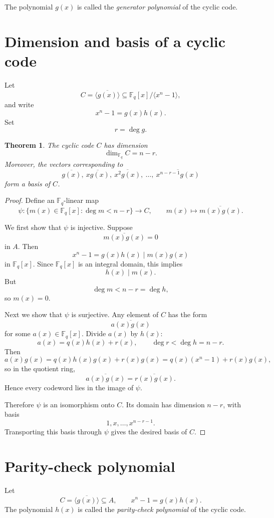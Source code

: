 \documentclass[11pt]{article}
\newtheorem{theorem}{Theorem}[section]
\theoremstyle{definition}
\newcommand{\F}{\mathbb{F}}
\newcommand{\ideal}[1]{\langle #1\rangle}
\newcommand{\ol}[1]{\overline{#1}}
\begin{document}
	The polynomial $g(x)$ is called the \emph{generator polynomial} of the cyclic code.
	
	\section{Dimension and basis of a cyclic code}
	
	Let
	\[
	C=\ideal{\ol{g(x)}}\subseteq \F_q[x]/\ideal{x^n-1},
	\]
	and write
	\[
	x^n-1=g(x)h(x).
	\]
	Set
	\[
	r=\deg g.
	\]
	
	\begin{theorem}\label{thm:dimension-basis}
		The cyclic code $C$ has dimension
		\[
		\dim_{\F_q} C = n-r.
		\]
		Moreover, the vectors corresponding to
		\[
		\ol{g(x)},\ \ol{xg(x)},\ \ol{x^2g(x)},\ \dots,\ \ol{x^{n-r-1}g(x)}
		\]
		form a basis of $C$.
	\end{theorem}
	
	\begin{proof}
		Define an $\F_q$-linear map
		\[
		\psi:\{m(x)\in \F_q[x]: \deg m < n-r\}\longrightarrow C,
		\qquad
		m(x)\longmapsto \ol{m(x)g(x)}.
		\]
		
		We first show that $\psi$ is injective. Suppose
		\[
		\ol{m(x)g(x)}=0
		\]
		in $A$. Then
		\[
		x^n-1=g(x)h(x)\mid m(x)g(x)
		\]
		in $\F_q[x]$. Since $\F_q[x]$ is an integral domain, this implies
		\[
		h(x)\mid m(x).
		\]
		But
		\[
		\deg m < n-r = \deg h,
		\]
		so $m(x)=0$.
		
		Next we show that $\psi$ is surjective. Any element of $C$ has the form
		\[
		\ol{a(x)g(x)}
		\]
		for some $a(x)\in \F_q[x]$. Divide $a(x)$ by $h(x)$:
		\[
		a(x)=q(x)h(x)+r(x),
		\qquad
		\deg r < \deg h = n-r.
		\]
		Then
		\[
		a(x)g(x)=q(x)h(x)g(x)+r(x)g(x)=q(x)(x^n-1)+r(x)g(x),
		\]
		so in the quotient ring,
		\[
		\ol{a(x)g(x)}=\ol{r(x)g(x)}.
		\]
		Hence every codeword lies in the image of $\psi$.
		
		Therefore $\psi$ is an isomorphism onto $C$. Its domain has dimension $n-r$, with basis
		\[
		1,x,\dots,x^{n-r-1}.
		\]
		Transporting this basis through $\psi$ gives the desired basis of $C$.
	\end{proof}
	
	\section{Parity-check polynomial}
	
	Let
	\[
	C=\ideal{\ol{g(x)}}\subseteq A,
	\qquad
	x^n-1=g(x)h(x).
	\]
	The polynomial $h(x)$ is called the \emph{parity-check polynomial} of the cyclic code.
	
\end{document}
